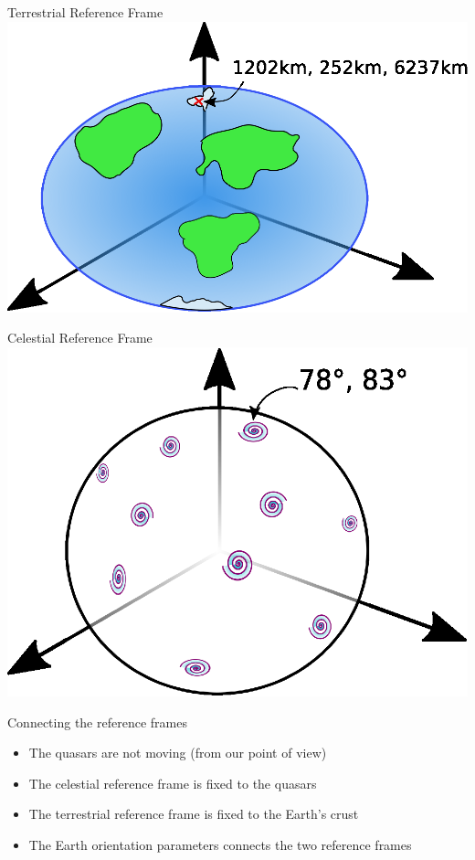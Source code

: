 \documentclass[14pt,table,t, c]{beamer}
\begin{document}
\begin{frame}{Terrestrial Reference Frame}
    \hfill\includegraphics[width=\linewidth]{figure/reference_frame}\hspace*{\fill}
\end{frame}

\begin{frame}{Celestial Reference Frame}
    \hfill\includegraphics[width=0.80\linewidth]{figure/celestial_reference_frame}\hspace*{\fill}
\end{frame}

\begin{frame}{Connecting the reference frames}
\begin{itemize}
\item The quasars are not moving (from our point of view)
\item The celestial reference frame is fixed to the quasars
\item The terrestrial reference frame is fixed to the Earth's crust
\item The Earth orientation parameters connects the two reference frames 
\end{itemize}

\end{frame}
\end{document}
